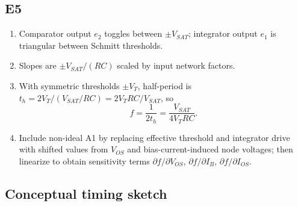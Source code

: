 \documentclass[12pt,a4paper]{article}
\begin{document}
\subsection{E5}
\begin{enumerate}
\item Comparator output $e_2$ toggles between $\pm V_{SAT}$; integrator output $e_1$ is triangular between Schmitt thresholds.
\item Slopes are $\pm V_{SAT}/(RC)$ scaled by input network factors.
\item With symmetric thresholds $\pm V_T$, half-period is $t_h=2V_T/(V_{SAT}/RC)=2V_TRC/V_{SAT}$, so 
\[
f=\frac{1}{2t_h}=\frac{V_{SAT}}{4V_TRC}.
\]
\item Include non-ideal A1 by replacing effective threshold and integrator drive with shifted values from $V_{OS}$ and bias-current-induced node voltages; then linearize to obtain sensitivity terms $\partial f/\partial V_{OS}$, $\partial f/\partial I_B$, $\partial f/\partial I_{OS}$.
\end{enumerate}

\subsection{Conceptual timing sketch}
\begin{center}
\end{center}
\end{document}
